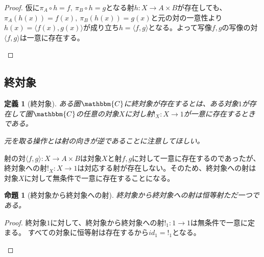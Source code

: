 \documentclass[dvipdfmx]{jsarticle}
\newcommand{\cat}[1]{\mathbbm{#1}}
\newcommand{\arrow}{\rightarrow}
\newcommand{\tuple}[1]{\langle #1\rangle}
\newcommand{\mor}[3]{#1:#2\arrow #3}
\newtheorem{proof}{証明}[section]
\newtheorem{prop}{命題}[section]
\newtheorem{define}{定義}[section]
\numberwithin{proof}{subsection}
\numberwithin{prop}{subsection}
\numberwithin{define}{subsection}
\begin{document}
\begin{proof}
		仮に$\pi_A\circ h=f,\ \pi_B\circ h=g$となる射$\mor{h}{X}{A\times B}$が存在しても、
		$\pi_A(h(x))=f(x),\ \pi_B(h(x))=g(x)$と元の対の一意性より$h(x)=\tuple{f(x),g(x)}$が成り立ち$h=\tuple{f,g}$となる。よって写像$f,g$の写像の対$\tuple{f,g}$は一意に存在する。
		\begin{center}
		\end{center}
	\end{proof}
	\subsection{終対象}
	\begin{define}[終対象]
		ある圏$\cat{C}$に終対象が存在するとは、ある対象$1$が存在して圏$\cat{C}$の任意の対象$X$に対し射$\mor{!_X}{X}{1}$が一意に存在するときである。

		元を取る操作とは射の向きが逆であることに注意してほしい。
	\end{define}
	射の対$\mor{\tuple{f,g}}{X}{A\times B}$は対象$X$と射$f,g$に対して一意に存在するのであったが、終対象への射$\mor{!_X}{X}{1}$は対応する射が存在しない。そのため、終対象への射は対象$X$に対して無条件で一意に存在することになる。
	\begin{prop}[終対象から終対象への射]
		終対象から終対象への射は恒等射ただ一つである。
	\end{prop}
	\begin{proof}
		終対象$1$に対して、終対象から終対象への射$\mor{!_1}{1}{1}$は無条件で一意に定まる。
		すべての対象に恒等射は存在するから$id_1=!_1$となる。
		\begin{center}
		\end{center}
	\end{proof}
\end{document}

